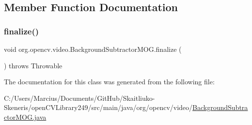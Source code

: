 \subsection{Member Function Documentation}
\mbox{\label{classorg_1_1opencv_1_1video_1_1_background_subtractor_m_o_g_a78dc82d9984004935b2c53ad459b7578}} 
\subsubsection{\texorpdfstring{finalize()}{finalize()}}
{\footnotesize\ttfamily void org.\+opencv.\+video.\+Background\+Subtractor\+M\+O\+G.\+finalize (\begin{DoxyParamCaption}{ }\end{DoxyParamCaption}) throws Throwable\hspace{0.3cm}{\ttfamily [protected]}}



The documentation for this class was generated from the following file\+:\begin{DoxyCompactItemize}
\item 
C\+:/\+Users/\+Marcius/\+Documents/\+Git\+Hub/\+Skaitliuko-\/\+Skeneris/open\+C\+V\+Library249/src/main/java/org/opencv/video/\mbox{\hyperlink{_background_subtractor_m_o_g_8java}{Background\+Subtractor\+M\+O\+G.\+java}}\end{DoxyCompactItemize}
